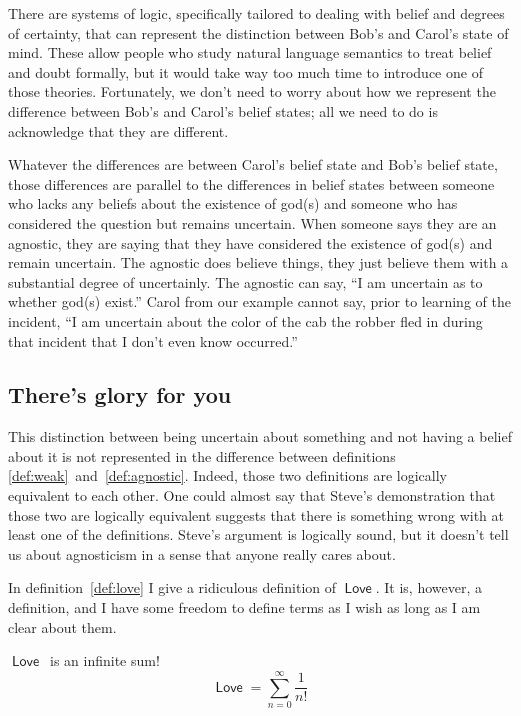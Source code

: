 \documentclass[12pt]{article}
\newcommand{\rel}[1]{\ensuremath{\mathop{\mathsf{#1}}}}
\newcommand{\rllove}{\rel{Love}}
\begin{document}
There are systems of logic, specifically tailored to dealing with belief and degrees of certainty, that can represent the distinction between Bob's and Carol's state of mind.
These allow people who study natural language semantics to treat belief and doubt formally, but it would take way too much time to introduce one of those theories.
Fortunately, we don't need to worry about how we represent the difference between Bob's and Carol's belief states;
all we need to do is acknowledge that they are different.

Whatever the differences are between Carol's belief state and Bob's belief state, those differences are parallel to the differences in belief states between someone who lacks any beliefs about the existence of god(s) and someone who has considered the question but remains uncertain.
When someone says they are an agnostic, they are saying that they have considered the existence of god(s) and remain uncertain.
The agnostic does believe things, they just believe them with a substantial degree of uncertainly. The agnostic can say, “I am uncertain as to whether god(s) exist.”
Carol from our example cannot say, prior to learning of the incident, “I am uncertain about the color of the cab the robber fled in during that incident that I don't even know occurred.”

\subsection{There's glory for you}

This distinction between being uncertain about something and not having a belief about it
is not represented in the difference between definitions \ref{def:weak}~and~\ref{def:agnostic}.
Indeed, those two definitions are logically equivalent to each other.
One could almost say that Steve's demonstration that those two are logically equivalent suggests that there is something wrong with at least one of the definitions.
Steve's argument is logically sound, but it doesn't tell us about agnosticism in a sense that anyone really cares about.

In definition~\ref{def:love} I give a ridiculous definition of \rllove.
It is, however, a definition, and I have some freedom to define terms as I wish as long as I am clear about them.

\begin{definition}\label{def:love}
    \rllove\ is an infinite sum!
    \[
     \rllove = \sum_{n=0}^\infty \frac{1}{n!}   
    \]   
\end{definition}
\end{document}
